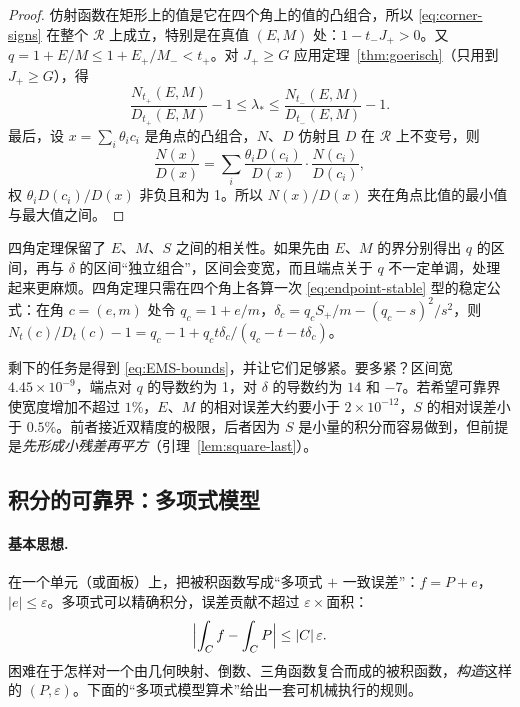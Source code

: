 \documentclass[11pt,a4paper,fontset=fandol]{ctexart}
\begin{document}
\begin{proof}
仿射函数在矩形上的值是它在四个角上的值的凸组合，所以 \eqref{eq:corner-signs} 在整个 $\mathcal R$ 上成立，特别是在真值 $(E,M)$ 处：$1-t_-J_+>0$。又 $q=1+E/M\le1+E_+/M_-<t_+$。对 $J_+\ge G$ 应用定理~\ref{thm:goerisch}（只用到 $J_+\ge G$），得
\[
\frac{N_{t_+}(E,M)}{D_{t_+}(E,M)}-1\le\lambda_*\le\frac{N_{t_-}(E,M)}{D_{t_-}(E,M)}-1 .
\]
最后，设 $x=\sum_i\theta_ic_i$ 是角点的凸组合，$N$、$D$ 仿射且 $D$ 在 $\mathcal R$ 上不变号，则
\[
\frac{N(x)}{D(x)}=\sum_i\frac{\theta_iD(c_i)}{D(x)}\cdot\frac{N(c_i)}{D(c_i)} ,
\]
权 $\theta_iD(c_i)/D(x)$ 非负且和为 1。所以 $N(x)/D(x)$ 夹在角点比值的最小值与最大值之间。
\end{proof}

\begin{remark}
四角定理保留了 $E$、$M$、$S$ 之间的相关性。如果先由 $E$、$M$ 的界分别得出 $q$ 的区间，再与 $\delta$ 的区间“独立组合”，区间会变宽，而且端点关于 $q$ 不一定单调，处理起来更麻烦。四角定理只需在四个角上各算一次 \eqref{eq:endpoint-stable} 型的稳定公式：在角 $c=(e,m)$ 处令 $q_c=1+e/m$，$\delta_c=q_cS_+/m-(q_c-s)^2/s^2$，则 $N_t(c)/D_t(c)-1=q_c-1+q_ct\delta_c/(q_c-t-t\delta_c)$。
\end{remark}

剩下的任务是得到 \eqref{eq:EMS-bounds}，并让它们足够紧。要多紧？区间宽 $4.45\times10^{-9}$，端点对 $q$ 的导数约为 1，对 $\delta$ 的导数约为 $14$ 和 $-7$。若希望可靠界使宽度增加不超过 $1\%$，$E$、$M$ 的相对误差大约要小于 $2\times10^{-12}$，$S$ 的相对误差小于 $0.5\%$。前者接近双精度的极限，后者因为 $S$ 是小量的积分而容易做到，但前提是\emph{先形成小残差再平方}（引理~\ref{lem:square-last}）。

\subsection{积分的可靠界：多项式模型}

\paragraph{基本思想.} 在一个单元（或面板）上，把被积函数写成“多项式 $+$ 一致误差”：$f=P+e$，$|e|\le\varepsilon$。多项式可以精确积分，误差贡献不超过 $\varepsilon\times$面积：
\begin{equation}
\label{eq:poly-cert}
\Bigl|\int_Cf-\int_CP\Bigr|\le|C|\,\varepsilon .
\end{equation}
困难在于怎样对一个由几何映射、倒数、三角函数复合而成的被积函数，\emph{构造}这样的 $(P,\varepsilon)$。下面的“多项式模型算术”给出一套可机械执行的规则。
\end{document}
